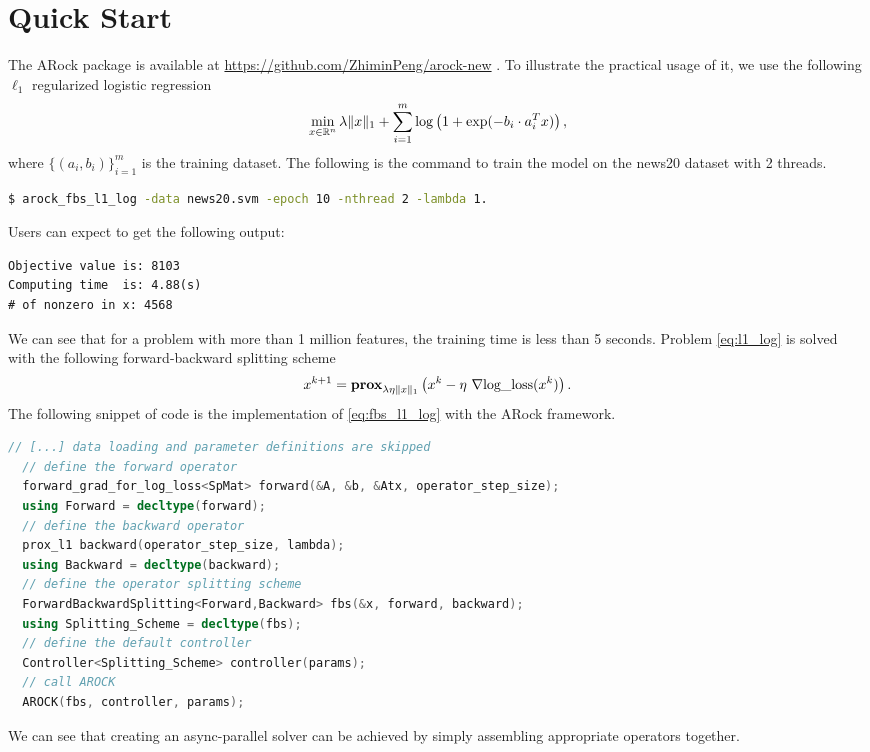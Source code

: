 \section{Quick Start}
The ARock package is available at \url{https://github.com/ZhiminPeng/arock-new} . To illustrate the practical usage of it, we use the following $\ell_1$ regularized logistic regression
\begin{equation}\label{eq:l1_log}
\min_{x \in \mathbb{R}^n} \lambda \|x\|_1 + \sum_{i = 1}^m \log\left(1 + \exp(-b_i \cdot a_i^T x)\right),
\end{equation}
where $\{(a_i, b_i)\}_{i = 1}^m$ is the training dataset. The following is the command to train the model on the news20 dataset with 2 threads. 
\begin{lstlisting}[language=bash]
$ arock_fbs_l1_log -data news20.svm -epoch 10 -nthread 2 -lambda 1.
\end{lstlisting}
Users can expect to get the following output:
\begin{lstlisting}[language={}]
Objective value is: 8103
Computing time  is: 4.88(s)
# of nonzero in x: 4568
\end{lstlisting}
We can see that for a problem with more than 1 million features, the training time is less than 5 seconds. Problem \eqref{eq:l1_log} is solved with the following forward-backward splitting scheme
\begin{equation}\label{eq:fbs_l1_log}
x^{k+1} = \mathbf{prox}_{\lambda \eta \|x\|_1} \left(x^k - \eta ~\nabla \text{log\_loss}(x^k)\right).
\end{equation}
The following snippet of code is the implementation of \eqref{eq:fbs_l1_log} with the ARock framework. 
\begin{lstlisting}[language=C++]
  // [...] data loading and parameter definitions are skipped
  // define the forward operator
  forward_grad_for_log_loss<SpMat> forward(&A, &b, &Atx, operator_step_size);
  using Forward = decltype(forward);
  // define the backward operator
  prox_l1 backward(operator_step_size, lambda);
  using Backward = decltype(backward);
  // define the operator splitting scheme
  ForwardBackwardSplitting<Forward,Backward> fbs(&x, forward, backward);  
  using Splitting_Scheme = decltype(fbs);
  // define the default controller
  Controller<Splitting_Scheme> controller(params);
  // call AROCK
  AROCK(fbs, controller, params);  
\end{lstlisting}
We can see that creating an async-parallel solver can be achieved by simply assembling appropriate operators together. 
